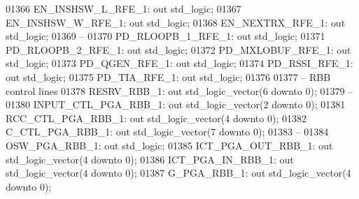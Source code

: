 \begin{DoxyCode}
01366         EN\_INSHSW\_L\_RFE\_1:  \textcolor{keywordflow}{out} \textcolor{comment}{std\_logic};
01367         EN\_INSHSW\_W\_RFE\_1:  \textcolor{keywordflow}{out} \textcolor{comment}{std\_logic};
01368         EN\_NEXTRX\_RFE\_1:    \textcolor{keywordflow}{out} \textcolor{comment}{std\_logic};
01369 \textcolor{keyword}{        --}
01370         PD\_RLOOPB\_1\_RFE\_1:  \textcolor{keywordflow}{out} \textcolor{comment}{std\_logic};
01371         PD\_RLOOPB\_2\_RFE\_1:  \textcolor{keywordflow}{out} \textcolor{comment}{std\_logic};
01372         PD\_MXLOBUF\_RFE\_1:   \textcolor{keywordflow}{out} \textcolor{comment}{std\_logic};
01373         PD\_QGEN\_RFE\_1:  \textcolor{keywordflow}{out} \textcolor{comment}{std\_logic};
01374         PD\_RSSI\_RFE\_1:  \textcolor{keywordflow}{out} \textcolor{comment}{std\_logic};
01375         PD\_TIA\_RFE\_1:   \textcolor{keywordflow}{out} \textcolor{comment}{std\_logic};
01376 
01377 \textcolor{keyword}{        -- RBB control lines }
01378         RESRV\_RBB\_1:        \textcolor{keywordflow}{out} \textcolor{comment}{std\_logic\_vector}(\textcolor{vhdllogic}{}\textcolor{vhdllogic}{6} \textcolor{keywordflow}{downto} \textcolor{vhdllogic}{}\textcolor{vhdllogic}{0});
01379 \textcolor{keyword}{        --}
01380         INPUT\_CTL\_PGA\_RBB\_1:    \textcolor{keywordflow}{out} \textcolor{comment}{std\_logic\_vector}(\textcolor{vhdllogic}{}\textcolor{vhdllogic}{2} \textcolor{keywordflow}{downto} \textcolor{vhdllogic}{}\textcolor{vhdllogic}{0});
01381         RCC\_CTL\_PGA\_RBB\_1:  \textcolor{keywordflow}{out} \textcolor{comment}{std\_logic\_vector}(\textcolor{vhdllogic}{}\textcolor{vhdllogic}{4} \textcolor{keywordflow}{downto} \textcolor{vhdllogic}{}\textcolor{vhdllogic}{0});
01382         C\_CTL\_PGA\_RBB\_1:    \textcolor{keywordflow}{out} \textcolor{comment}{std\_logic\_vector}(\textcolor{vhdllogic}{}\textcolor{vhdllogic}{7} \textcolor{keywordflow}{downto} \textcolor{vhdllogic}{}\textcolor{vhdllogic}{0});
01383 \textcolor{keyword}{        --}
01384         OSW\_PGA\_RBB\_1:  \textcolor{keywordflow}{out} \textcolor{comment}{std\_logic};
01385         ICT\_PGA\_OUT\_RBB\_1:  \textcolor{keywordflow}{out} \textcolor{comment}{std\_logic\_vector}(\textcolor{vhdllogic}{}\textcolor{vhdllogic}{4} \textcolor{keywordflow}{downto} \textcolor{vhdllogic}{}\textcolor{vhdllogic}{0});
01386         ICT\_PGA\_IN\_RBB\_1:   \textcolor{keywordflow}{out} \textcolor{comment}{std\_logic\_vector}(\textcolor{vhdllogic}{}\textcolor{vhdllogic}{4} \textcolor{keywordflow}{downto} \textcolor{vhdllogic}{}\textcolor{vhdllogic}{0});
01387         G\_PGA\_RBB\_1:    \textcolor{keywordflow}{out} \textcolor{comment}{std\_logic\_vector}(\textcolor{vhdllogic}{}\textcolor{vhdllogic}{4} \textcolor{keywordflow}{downto} \textcolor{vhdllogic}{}\textcolor{vhdllogic}{0});

\end{DoxyCode}
